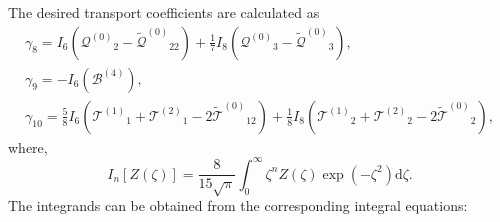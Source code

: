 \documentclass[review]{elsarticle}
\newcommand{\dd}{\mathrm{d}}
\newcommand{\B}{\ensuremath{\mathcal{B}^{(4)}}}
\newcommand{\Q}{\ensuremath{\mathcal{Q}^{(0)}}}
\newcommand{\T}[1]{\ensuremath{\mathcal{T}^{(#1)}}}
\newcommand{\TT}{\ensuremath{\tilde{\mathcal{T}}^{(0)}}}
\newcommand{\QQ}{\ensuremath{\tilde{\mathcal{Q}}^{(0)}}}
\begin{document}
The desired transport coefficients are calculated as
\begin{gather}
    \gamma_8 = I_6\left(\Q_2 - \QQ_{22}\right) + \frac17 I_8\left(\Q_3 - \QQ_3\right), \label{eq:gamma_8}\\
    \gamma_9 = -I_6\left(\B\right), \label{eq:gamma_9}\\
    \gamma_{10} = \frac58 I_6\left(\T{1}_1 + \T{2}_1 - 2\TT_{12}\right)
        + \frac18 I_8\left(\T{1}_2 + \T{2}_2 - 2\TT_2\right), \label{eq:gamma_10}
\end{gather}
where,
\begin{equation}\label{eq:I_n}
    I_n[Z(\zeta)] = \frac{8}{15\sqrt{\pi}} \int_0^\infty \zeta^n Z(\zeta) \exp(-\zeta^2) \dd\zeta.
\end{equation}
The integrands can be obtained from the corresponding integral equations:
\end{document}
